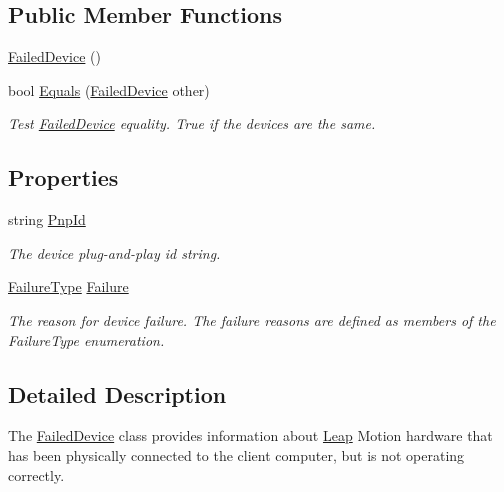 \subsection*{Public Member Functions}
\begin{DoxyCompactItemize}
\item 
\mbox{\hyperlink{class_leap_1_1_failed_device_a398ef7c331011c70c192ec349841d881}{Failed\+Device}} ()
\item 
bool \mbox{\hyperlink{class_leap_1_1_failed_device_aca8825e6fb28beea78f313647bc9556f}{Equals}} (\mbox{\hyperlink{class_leap_1_1_failed_device}{Failed\+Device}} other)
\begin{DoxyCompactList}\small\item\em Test \mbox{\hyperlink{class_leap_1_1_failed_device}{Failed\+Device}} equality. True if the devices are the same. \end{DoxyCompactList}\end{DoxyCompactItemize}
\subsection*{Properties}
\begin{DoxyCompactItemize}
\item 
string \mbox{\hyperlink{class_leap_1_1_failed_device_a56b58cdaa74dae4bc05b229c2ffdea0e}{Pnp\+Id}}
\begin{DoxyCompactList}\small\item\em The device plug-\/and-\/play id string. \end{DoxyCompactList}\item 
\mbox{\hyperlink{class_leap_1_1_failed_device_a2737c8ecbc644f3d14200183fe08c3a9}{Failure\+Type}} \mbox{\hyperlink{class_leap_1_1_failed_device_a13be15f5e378c194ddcd0a4098d2d3fc}{Failure}}
\begin{DoxyCompactList}\small\item\em The reason for device failure. The failure reasons are defined as members of the Failure\+Type enumeration. \end{DoxyCompactList}\end{DoxyCompactItemize}


\subsection{Detailed Description}
The \mbox{\hyperlink{class_leap_1_1_failed_device}{Failed\+Device}} class provides information about \mbox{\hyperlink{namespace_leap}{Leap}} Motion hardware that has been physically connected to the client computer, but is not operating correctly. 

